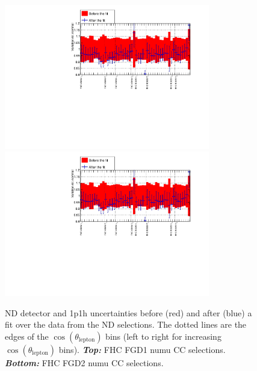 \begin{figure}[ht]
  \begin{center}
    \includegraphics[width=0.8\textwidth,page=6]{images/BANFF/OutputData_histos.pdf}\\
    \includegraphics[width=0.8\textwidth,page=7]{images/BANFF/OutputData_histos.pdf}
    \caption[ND280 detector and 1p1h uncertainties before and after a
    fit over the data from the FHC $\nu_\mu$ ND280
    selections]{\Gls{ND} detector and 1p1h uncertainties before (red)
      and after (blue) a fit over the data from the \Gls{ND}
      selections. The dotted lines are the edges of the
      $\cos(\theta_\text{lepton})$ bins (left to right for increasing
      $\cos(\theta_\text{lepton})$ bins). \textbf{\textit{Top:}}
      \Gls{FHC} \Gls{FGD}1 \Gls{numu} \Gls{CC} selections.
      \textbf{\textit{Bottom:}} \Gls{FHC} \Gls{FGD}2 \Gls{numu}
      \Gls{CC} selections.}
    \label{fig:datadet1}
  \end{center}
\end{figure}

